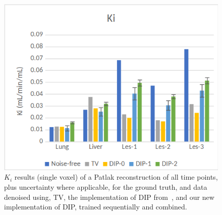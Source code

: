         \begin{figure}
            \centering
            
            \includegraphics[width=1.0\linewidth]{figures/deep_image_prior_results_ki.png}
            
            \captionsetup{singlelinecheck=false}
            \caption{
                $K_i$ results (single voxel) of a Patlak reconstruction of all time points, plus uncertainty where applicable, for the ground truth, and data denoised using, \gls{TV}, the implementation of \gls{DIP} from~\parencite{Gong2019PETPrior}, and our new implementation of \gls{DIP}, trained sequentially and combined.
            }
            \label{fig:pseudo_bayesian_dip_denoising_as_a_preprocessing_step_for_kinetic_modelling_in_dynamic_pet_appendix_results_ki}
        \end{figure}
        
